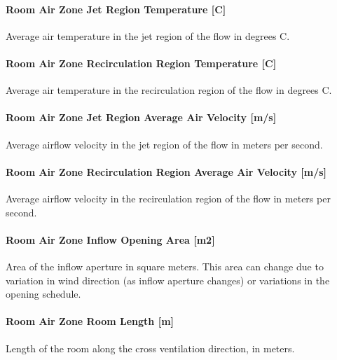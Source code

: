 \paragraph{Room Air Zone Jet Region Temperature {[}C{]}}\label{room-air-zone-jet-region-temperature-c-1}

Average air temperature in the jet region of the flow in degrees C.

\paragraph{Room Air Zone Recirculation Region Temperature {[}C{]}}\label{room-air-zone-recirculation-region-temperature-c-1}

Average air temperature in the recirculation region of the flow in degrees C.

\paragraph{Room Air Zone Jet Region Average Air Velocity {[}m/s{]}}\label{room-air-zone-jet-region-average-air-velocity-ms-1}

Average airflow velocity in the jet region of the flow in meters per second.

\paragraph{Room Air Zone Recirculation Region Average Air Velocity {[}m/s{]}}\label{room-air-zone-recirculation-region-average-air-velocity-ms-1}

Average airflow velocity in the recirculation region of the flow in meters per second.

\paragraph{Room Air Zone Inflow Opening Area {[}m2{]}}\label{room-air-zone-inflow-opening-area-m2-1}

Area of the inflow aperture in square meters. This area can change due to variation in wind direction (as inflow aperture changes) or variations in the opening schedule.

\paragraph{Room Air Zone Room Length {[}m{]}}\label{room-air-zone-room-length-m-1}

Length of the room along the cross ventilation direction, in meters.

